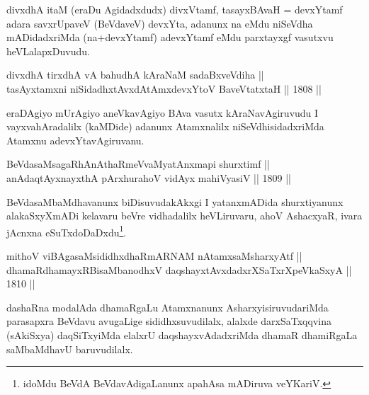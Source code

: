 \begin{artha}
divxdhA itaM (eraDu Agidadxdudx) divxVtamf, tasayxBAvaH = devxYtamf
adara savxrUpaveV (BeVdaveV) devxYta, adanunx na eMdu niSeVdha
mADidadxriMda (na+devxYtamf) adevxYtamf eMdu parxtayxgf vasutxvu
heVLalapxDuvudu.
\end{artha}


\begin{shl}
divxdhA tirxdhA vA bahudhA kAraNaM sadaBxveVdiha || \\
tasAyx\s \s tamxni niSidadhxtAvxdAtAmx\s devxYtoV BaveVtatxtaH \hfill || 1808 ||  
\end{shl}

\begin{artha}
eraDAgiyo mUrAgiyo aneVkavAgiyo BAva vasutx kAraNavAgiruvudu I
vayxvahAradalilx (kaMDide) adanunx Atamxnalilx niSeVdhisidadxriMda
Atamxnu adevxYtavAgiruvanu.
\end{artha}


\begin{shl}
BeVdasaMsagaRhAnAthaRmeVvaMyatAnxmapi shurxtimf ||  \\
anAdaqtAyxnayxthA pArxhurahoV vidAyx mahiVyasiV \hfill || 1809 ||  
\end{shl}

\begin{artha}
BeVdasaMbaMdhavanunx biDisuvudakAkxgi I yatanxmADida shurxtiyanunx
alakaSxyXmADi kelavaru beVre vidhadalilx heVLiruvaru, ahoV AshacxyaR,
ivara jAcnxna eSuTxdoDaDxdu\footnote{idoMdu BeVdA BeVdavAdigaLanunx
apahAsa mADiruva veYKariV.}.
\end{artha}

\begin{shl}
mithoV viBAgasaMsididhxdhaRmARNAM nA\s \s tamxsaMsharxyAtf || \\
dhamaRdhamayxRBisaMbanodhxV daqshayxtAvxdadxrXSaTxrXpeVkaSxyA \hfill || 1810 ||  
\end{shl}

\begin{artha}
dashaRna modalAda dhamaRgaLu Atamxnanunx AsharxyisiruvudariMda
parasapxra BeVdavu avugaLige sididhxsuvudilalx,
alalxde darxSaTxqqvina (sAkiSxya) daqSiTxyiMda elalxrU
daqshayxvAdadxriMda dhamaR dhamiRgaLa saMbaMdhavU baruvudilalx.
\end{artha}


